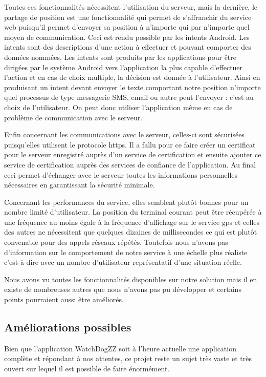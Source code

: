 Toutes ces fonctionnalités nécessitent l’utilisation du serveur, mais la dernière, le partage de position est une fonctionnalité qui permet de s’affranchir du service web puisqu’il permet d’envoyer sa position à n’importe qui par n’importe quel moyen de communication. Ceci est rendu possible par les intents Android. Les intents sont des descriptions d’une action à effectuer et pouvant comporter des données nommées. Les intents sont produits par les applications pour être dirigées par le système Android vers l’application la plus capable d’effectuer l’action et en cas de choix multiple, la décision est donnée à l’utilisateur. Ainsi en produisant un intent devant envoyer le texte comportant notre position n’importe quel processus de type messagerie SMS, email ou autre peut l’envoyer : c’est au choix de l’utilisateur. On peut donc utiliser l’application même en cas de problème de communication avec le serveur.

Enfin concernant les communications avec le serveur, celles-ci sont sécurisées puisqu’elles utilisent le protocole https. Il a fallu pour ce faire créer un certificat pour le serveur enregistré auprès d’un service de certification et ensuite ajouter ce service de certification auprès des services de confiance de l’application. Au final ceci permet d’échanger avec le serveur toutes les informations personnelles nécessaires en garantissant la sécurité minimale.

Concernant les performances du service, elles semblent plutôt bonnes pour un nombre limité d’utilisateur. La position du terminal courant peut être récupérée à une fréquence au moins égale à la fréquence d’affichage sur le service gps et celles des autres ne nécessitent que quelques dizaines de millisecondes ce qui est plutôt convenable pour des appels réseaux répétés. Toutefois nous n’avons pas d’information sur le comportement de notre service à une échelle plus réaliste c’est-à-dire avec un nombre d’utilisateur représentatif d’une situation réelle.

Nous avons vu toutes les fonctionnalités disponibles sur notre solution mais il en existe de nombreuses autres que nous n’avons pas pu développer et certains points pourraient aussi être améliorés.

\subsection{Améliorations possibles}

Bien que l'application WatchDogZZ soit à l'heure actuelle une application complète et répondant à nos attentes, ce projet reste un sujet très vaste et très ouvert sur lequel il est possible de faire énormément.

